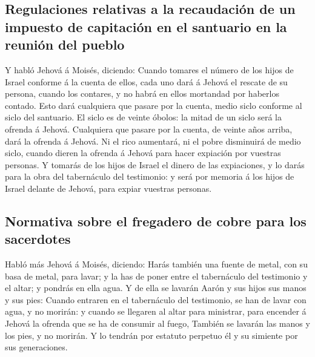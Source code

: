 \hypertarget{regulaciones-relativas-a-la-recaudaciuxf3n-de-un-impuesto-de-capitaciuxf3n-en-el-santuario-en-la-reuniuxf3n-del-pueblo}{%
\subsection{Regulaciones relativas a la recaudación de un impuesto de
capitación en el santuario en la reunión del
pueblo}\label{regulaciones-relativas-a-la-recaudaciuxf3n-de-un-impuesto-de-capitaciuxf3n-en-el-santuario-en-la-reuniuxf3n-del-pueblo}}

 Y habló Jehová á Moisés, diciendo: 
Cuando tomares el número de los hijos de Israel conforme á la cuenta de
ellos, cada uno dará á Jehová el rescate de su persona, cuando los
contares, y no habrá en ellos mortandad por haberlos contado.
 Esto dará cualquiera que pasare por la cuenta, medio
siclo conforme al siclo del santuario. El siclo es de veinte óbolos: la
mitad de un siclo será la ofrenda á Jehová.  Cualquiera
que pasare por la cuenta, de veinte años arriba, dará la ofrenda á
Jehová.  Ni el rico aumentará, ni el pobre disminuirá de
medio siclo, cuando dieren la ofrenda á Jehová para hacer expiación por
vuestras personas.  Y tomarás de los hijos de Israel el
dinero de las expiaciones, y lo darás para la obra del tabernáculo del
testimonio: y será por memoria á los hijos de Israel delante de Jehová,
para expiar vuestras personas.

\hypertarget{normativa-sobre-el-fregadero-de-cobre-para-los-sacerdotes}{%
\subsection{Normativa sobre el fregadero de cobre para los
sacerdotes}\label{normativa-sobre-el-fregadero-de-cobre-para-los-sacerdotes}}

 Habló más Jehová á Moisés, diciendo: 
Harás también una fuente de metal, con su basa de metal, para lavar; y
la has de poner entre el tabernáculo del testimonio y el altar; y
pondrás en ella agua.  Y de ella se lavarán Aarón y sus
hijos sus manos y sus pies:  Cuando entraren en el
tabernáculo del testimonio, se han de lavar con agua, y no morirán: y
cuando se llegaren al altar para ministrar, para encender á Jehová la
ofrenda que se ha de consumir al fuego,  También se
lavarán las manos y los pies, y no morirán. Y lo tendrán por estatuto
perpetuo él y su simiente por sus generaciones.

